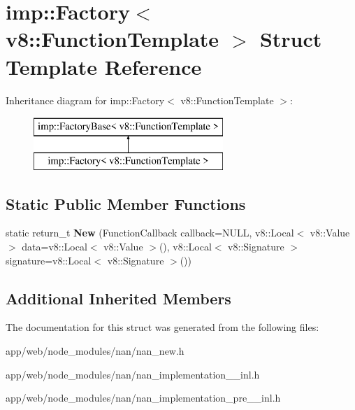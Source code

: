 \hypertarget{structimp_1_1_factory_3_01v8_1_1_function_template_01_4}{}\section{imp\+:\+:Factory$<$ v8\+:\+:Function\+Template $>$ Struct Template Reference}
\label{structimp_1_1_factory_3_01v8_1_1_function_template_01_4}
Inheritance diagram for imp\+:\+:Factory$<$ v8\+:\+:Function\+Template $>$\+:\begin{figure}[H]
\begin{center}
\leavevmode
\includegraphics[height=2.000000cm]{structimp_1_1_factory_3_01v8_1_1_function_template_01_4}
\end{center}
\end{figure}
\subsection*{Static Public Member Functions}
\begin{DoxyCompactItemize}
\item 
\mbox{\label{structimp_1_1_factory_3_01v8_1_1_function_template_01_4_ab04abb5667a74466a159a32255875873}} 
static return\+\_\+t {\bfseries New} (Function\+Callback callback=N\+U\+LL, v8\+::\+Local$<$ v8\+::\+Value $>$ data=v8\+::\+Local$<$ v8\+::\+Value $>$(), v8\+::\+Local$<$ v8\+::\+Signature $>$ signature=v8\+::\+Local$<$ v8\+::\+Signature $>$())
\end{DoxyCompactItemize}
\subsection*{Additional Inherited Members}


The documentation for this struct was generated from the following files\+:\begin{DoxyCompactItemize}
\item 
app/web/node\+\_\+modules/nan/nan\+\_\+new.\+h\item 
app/web/node\+\_\+modules/nan/nan\+\_\+implementation\+\_\+\_\+inl.\+h\item 
app/web/node\+\_\+modules/nan/nan\+\_\+implementation\+\_\+pre\+\_\+\_\+inl.\+h\end{DoxyCompactItemize}
